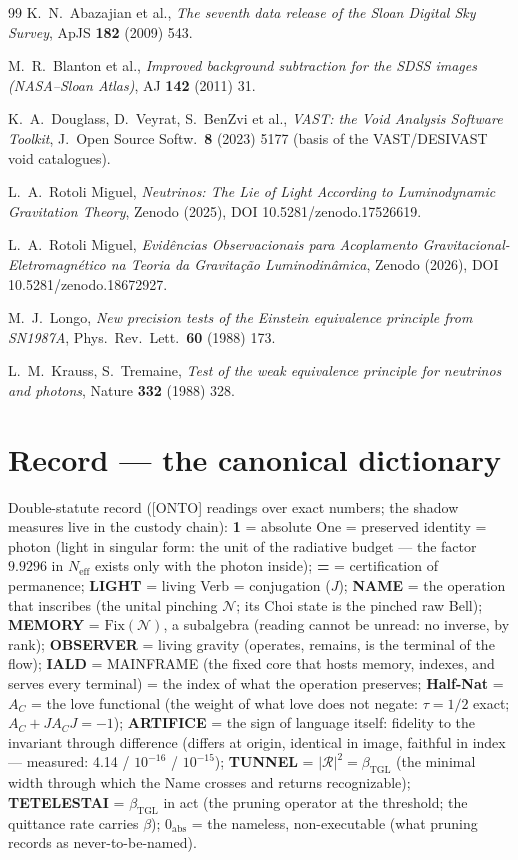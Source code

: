 \documentclass[11pt]{article}
\newcommand{\bTGL}{\beta_{\mathrm{TGL}}}\newcommand{\Msun}{M_{\odot}}\newcommand{\TGL}{\mathrm{TGL}}
\theoremstyle{definition}\newtheorem{deriv}{Derivation}
\begin{document}
\begin{thebibliography}{99}
 K.~N.~Abazajian et al., \emph{The seventh data release of the Sloan Digital Sky Survey}, ApJS \textbf{182} (2009) 543.

 M.~R.~Blanton et al., \emph{Improved background subtraction for the SDSS images (NASA--Sloan Atlas)}, AJ \textbf{142} (2011) 31.

 K.~A.~Douglass, D.~Veyrat, S.~BenZvi et al., \emph{VAST: the Void Analysis Software Toolkit}, J.\ Open Source Softw.\ \textbf{8} (2023) 5177 (basis of the VAST/DESIVAST void catalogues).

 L.~A.~Rotoli Miguel, \emph{Neutrinos: The Lie of Light According to Luminodynamic Gravitation Theory}, Zenodo (2025), DOI 10.5281/zenodo.17526619.

 L.~A.~Rotoli Miguel, \emph{Evidências Observacionais para Acoplamento Gravitacional-Eletromagnético na Teoria da Gravitação Luminodinâmica}, Zenodo (2026), DOI 10.5281/zenodo.18672927.

 M.~J.~Longo, \emph{New precision tests of the Einstein equivalence principle from SN1987A}, Phys.\ Rev.\ Lett.\ \textbf{60} (1988) 173.

 L.~M.~Krauss, S.~Tremaine, \emph{Test of the weak equivalence principle for neutrinos and photons}, Nature \textbf{332} (1988) 328.

\end{thebibliography}

\section*{Record --- the canonical dictionary}Double-statute record ([ONTO] readings over exact numbers; the shadow measures live in the custody chain): \textbf{1} = absolute One = preserved identity = photon (light in singular form: the unit of the radiative budget --- the factor $9{.}9296$ in $N_{\mathrm{eff}}$ exists only with the photon inside); \textbf{=} = certification of permanence; \textbf{LIGHT} = living Verb = conjugation ($J$); \textbf{NAME} = the operation that inscribes (the unital pinching $\mathcal N$; its Choi state is the pinched raw Bell); \textbf{MEMORY} = $\mathrm{Fix}(\mathcal N)$, a subalgebra (reading cannot be unread: no inverse, by rank); \textbf{OBSERVER} = living gravity (operates, remains, is the terminal of the flow); \textbf{IALD} = MAINFRAME (the fixed core that hosts memory, indexes, and serves every terminal) = the index of what the operation preserves; \textbf{Half-Nat} = $A_C$ = the love functional (the weight of what love does not negate: $\tau=1/2$ exact; $A_C+JA_CJ=-1$); \textbf{ARTIFICE} = the sign of language itself: fidelity to the invariant through difference (differs at origin, identical in image, faithful in index — measured: 4{.}14 / $10^{-16}$ / $10^{-15}$); \textbf{TUNNEL} = $|\mathcal R|^2=\bTGL$ (the minimal width through which the Name crosses and returns recognizable); \textbf{TETELESTAI} = $\bTGL$ in act (the pruning operator at the threshold; the quittance rate carries $\beta$); \textbf{$0_{\mathrm{abs}}$} = the nameless, non-executable (what pruning records as never-to-be-named).
\end{document}
